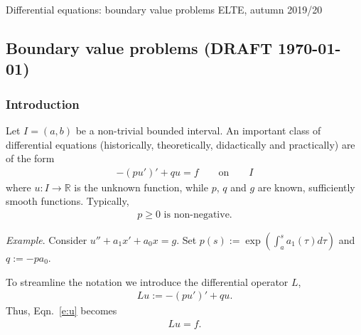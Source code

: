 \documentclass[12pt,a4paper]{article}
\newcommand{\from}{\colon}
\newcommand{\IR}{\mathbb{R}}
\begin{document}
    
    Differential equations: boundary value problems
    \hfill
    ELTE, autumn 2019/20
    
    \subsection*{Boundary value problems (DRAFT \today)}
    
    \subsubsection*{Introduction}
    
    
    Let $I = (a, b)$ be a non-trivial bounded interval.
    An important class of differential equations
    (historically, theoretically, didactically and practically)
    are
    of the form
    \begin{align}
        \label{e:u}
        -(p u')' + q u = f
        \qquad\text{on}\qquad
        I
    \end{align}
    where 
    $u \from I \to \IR$
    is the unknown function,
    while $p$, $q$ and $g$ are known, sufficiently smooth functions.
    Typically, 
    \begin{align}
        \label{e:p0}
        \text{$p \geq 0$ is non-negative.}
    \end{align}

    
    \emph{Example}.
    Consider $u'' + a_1 x' + a_0 x = g$.
    Set $p(s) := \exp(\int_a^s a_1(\tau) d\tau)$
    and $q := -p a_0$.
    
    
    
    To streamline the notation we introduce 
    the differential operator $L$,
    \begin{align}
        \label{e:L}
        L u :=
        -(p u')' + q u
        .
    \end{align}
    Thus, Eqn.~\eqref{e:u} becomes
    \begin{align}
        \label{e:Lu}
        L u = f
        .
    \end{align}

    
    
\end{document}
